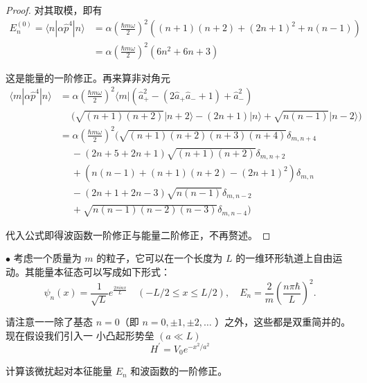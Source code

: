 \begin{proof}
对其取模，即有
$$\begin{aligned}
E_{n}^{(0)}=\langle n| \alpha \hat{p}^{4}|n\rangle
&=\alpha\left(\frac{\hbar m \omega}{2}\right)^{2}\left((n+1)(n+2)+(2n+1)^{2}+n(n-1)\right) \\
&=\alpha\left(\frac{\hbar m \omega}{2}\right)^{2}\left(6n^{2}+6n+3\right)
\end{aligned}$$

这是能量的一阶修正。再来算非对角元
$$\begin{aligned}
\langle m| \alpha \hat{p}^{4}|n\rangle&= \alpha\left(\frac{\hbar m \omega}{2}\right)^{2}\langle m|\left(\hat{a}_{+}^{2}-\left(2 \hat{a}_{+} \hat{a}_{-}+1\right)+\hat{a}_{-}^{2}\right) \\
& \quad\ \big(\sqrt{(n+1)(n+2)}|n+2\rangle-(2 n+1)|n\rangle+\sqrt{n(n-1)}|n-2\rangle\big) \\
&= \alpha\left(\frac{\hbar m \omega}{2}\right)^{2}\bigg(\sqrt{(n+1)(n+2)(n+3)(n+4)} \delta_{m, n+4} \\
& \quad\ -(2n+5+2n+1) \sqrt{(n+1)(n+2)} \delta_{m, n+2} \\
& \quad\ +\left(n(n-1)+(n+1)(n+2)-(2n+1)^{2}\right) \delta_{m, n} \\
& \quad\ -(2n+1+2n-3) \sqrt{n(n-1)} \delta_{m, n-2} \\
& \quad\ +\sqrt{n(n-1)(n-2)(n-3)} \delta_{m, n-4}\bigg)
\end{aligned}$$

代入公式即得波函数一阶修正与能量二阶修正，不再赘述。
\end{proof}
\begin{2}
    $\bullet$ 考虑一个质量为 $m$ 的粒子，它可以在一个长度为 $L$ 的一维环形轨道上自由运动。其能量本征态可以写成如下形式：
$$\psi_{n}(x)=\frac{1}{\sqrt{L}} e^{\frac{2 \pi i n x}{L}} \quad(-L / 2 \leq x \leq L / 2), 
\quad E_{n}=\frac{2}{m}\left(\frac{n \pi \hbar}{L}\right)^{2}.$$

请注意一一除了基态 $n=0$（即 $n=0, \pm 1, \pm 2, \ldots$ ）之外，这些都是双重简并的。现在假设我们引入一 小凸起形势垒 $(a \ll L)$
$$H^{\prime}=V_{0} e^{-x^{2} / a^{2}}$$

计算该微扰起对本征能量 $E_{n}$ 和波函数的一阶修正。
\end{2}
